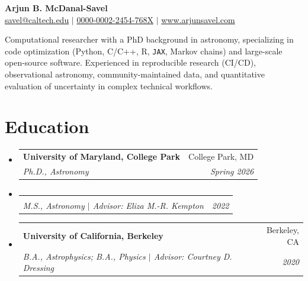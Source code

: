 \documentclass[letterpaper,11pt]{article}
\makeatletter
\newcommand{\resumeItemNoBullet}[2]{
  \item[]\small{
    \hspace{-9pt}\textbf{#1}{: #2 \vspace{-6pt}}
  }
}
\newcommand{\resumeSubheading}[4]{
  \vspace{-1pt}\item[]
  \begin{tabular*}{0.98\textwidth}{l@{\extracolsep{\fill}}r}
      \hspace{-10pt}\textbf{#1} & #2 \\
      \hspace{-10pt}\textit{\small#3} & \textit{\small #4} \\
    \end{tabular*}\vspace{-5pt}
}
\newcommand{\resumeSubHeadingListStart}{\begin{itemize}[leftmargin=*]}
\newcommand{\resumeSubHeadingListEnd}{\end{itemize}}
\newcommand{\shorterSection}[1]{\vspace{-10pt}\section{#1}}
\makeatother
\begin{document}
\thispagestyle{empty}


\begin{center}
  \small \textbf{\Large Arjun B. McDanal-Savel} \\
  \vspace{4pt}
  \textsf{\small \href{href="mailto:savel@caltech.edu"}{savel@caltech.edu}} $\vert$   \href{https://orcid.org/0000-0002-2454-768X/}{0000-0002-2454-768X} $\vert$ \href{www.arjunsavel.com}{www.arjunsavel.com}
\end{center}
\vspace{-10pt}

Computational researcher with a PhD background in astronomy, specializing in code optimization (Python, C/C++, R, \texttt{JAX}, Markov chains) and large-scale open-source software. Experienced in reproducible research  (CI/CD), observational astronomy, community-maintained data, and quantitative evaluation of uncertainty in complex technical workflows.
\shorterSection{Education}
  \resumeSubHeadingListStart
    \resumeSubheading
      {University of Maryland, College Park}{College Park, MD}
      {Ph.D., Astronomy}{Spring 2026}{
    }
    \vspace{-37pt}
    \resumeSubheading
    {}{}{M.S., Astronomy $\vert$ Advisor: Eliza M.-R. Kempton}{2022}{
    }
    \vspace{-20pt}
    \resumeSubheading
      {University of California, Berkeley}{Berkeley, CA}
      {B.A., Astrophysics; B.A., Physics $\vert$ Advisor: Courtney D. Dressing}{2020}{
    }

    

  \resumeSubHeadingListEnd
\end{document}
